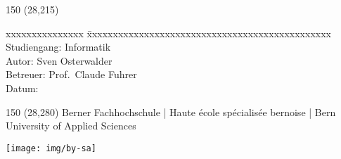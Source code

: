 \begin{titlepage}
\begin{flushleft}
    \begin{textblock}{150} (28,215)
        \fontsize{10pt}{17pt}\selectfont
        \begin{tabbing}
        xxxxxxxxxxxxxxx   \= xxxxxxxxxxxxxxxxxxxxxxxxxxxxxxxxxxxxxxxxxxxxxxx \kill
        Studiengang:      \> Informatik                                         \\
        Autor:            \> Sven Osterwalder\protect\footnotemark[1]{}         \\
        Betreuer:         \> Prof.~Claude Fuhrer\protect\footnotemark[2]{} \\
        Datum:            \> \versiondate{}                                     \\
        \end{tabbing}
    \end{textblock}
\end{flushleft}

\begin{textblock}{150} (28,280)
\noindent 
\color{bfhgrey}\fontsize{9pt}{10pt}\selectfont
Berner Fachhochschule | Haute école spécialisée bernoise | Bern University of Applied Sciences
\color{black}\selectfont
\end{textblock}


\vfill
\texttt{[image: img/by-sa]}\\ \small{}

\end{titlepage}

%
%
